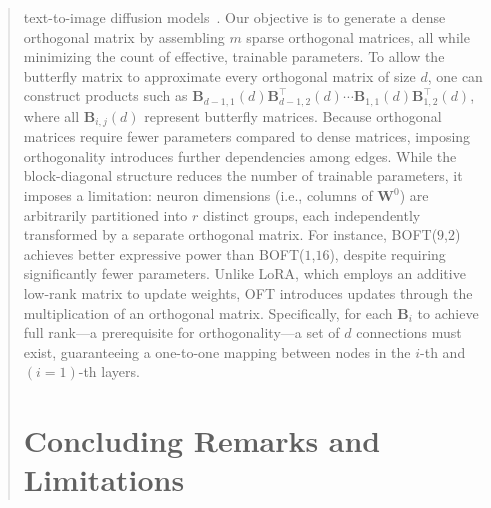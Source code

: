 \begin{itemize}[leftmargin=*,nosep]
\begin{theorem}
\begin{abstract}
text-to-image diffusion models~\cite{qiu2023controlling}. Our objective is to generate a dense orthogonal matrix by assembling $m$ sparse orthogonal matrices, all while minimizing the count of effective, trainable parameters. To allow the butterfly matrix to approximate every orthogonal matrix of size $d$, one can construct products such as $\bm{B}_{d-1,1}(d)\bm{B}^\top_{d-1,2}(d)\cdots\bm{B}_{1,1}(d)\bm{B}^\top_{1,2}(d)$, where all $\bm{B}_{i,j}(d)$ represent butterfly matrices. Because orthogonal matrices require fewer parameters compared to dense matrices, imposing orthogonality introduces further dependencies among edges. While the block-diagonal structure reduces the number of trainable parameters, it imposes a limitation: neuron dimensions (i.e., columns of $\bm{W}^0$) are arbitrarily partitioned into $r$ distinct groups, each independently transformed by a separate orthogonal matrix. For instance, BOFT($9$,$2$) achieves better expressive power than BOFT($1$,$16$), despite requiring significantly fewer parameters. Unlike LoRA, which employs an additive low-rank matrix to update weights, OFT introduces updates through the multiplication of an orthogonal matrix. Specifically, for each $\bm{B}_i$ to achieve full rank—a prerequisite for orthogonality—a set of $d$ connections must exist, guaranteeing a one-to-one mapping between nodes in the $i$-th and $(i=1)$-th layers. 

\section{Concluding Remarks and Limitations}


\end{abstract}
\end{theorem}
\end{itemize}
